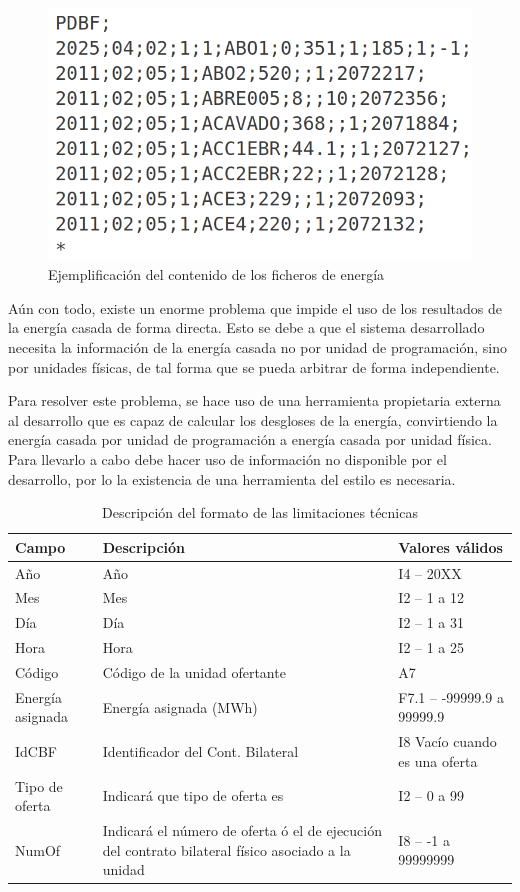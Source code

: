 \begin{figure}
\centering
\includegraphics[width=0.5\linewidth]{figures/contenido-energia.png}
\caption{Ejemplificación del contenido de los ficheros de energía}
\label{fig:contenido-energia}
\end{figure}

Aún con todo, existe un enorme problema que impide el uso de los resultados de la energía casada de forma directa. Esto se debe a que el sistema desarrollado necesita la información de la energía casada no por unidad de programación, sino por unidades físicas, de tal forma que se pueda arbitrar de forma independiente.

Para resolver este problema, se hace uso de una herramienta propietaria externa al desarrollo que es capaz de calcular los desgloses de la energía, convirtiendo la energía casada por unidad de programación a energía casada por unidad física. Para llevarlo a cabo debe hacer uso de información no disponible por el desarrollo, por lo la existencia de una herramienta del estilo es necesaria.

\begin{table}[ht]
\centering
\begin{tabular}{|l|p{5cm}|l|}
\hline
Campo & Descripción & Valores válidos \\
\hline
Año & Año & I4 -- 20XX \\
Mes & Mes & I2 -- 1 a 12 \\
Día & Día & I2 -- 1 a 31 \\
Hora & Hora & I2 -- 1 a 25 \\
Código & Código de la unidad ofertante & A7 \\
Energía asignada & Energía asignada (MWh) & F7.1 – -99999.9 a 99999.9 \\
IdCBF & Identificador del Cont. Bilateral & I8 Vacío cuando es una oferta \\
Tipo de oferta & Indicará que tipo de oferta es & I2 – 0 a 99 \\
NumOf & Indicará el número de oferta ó el de ejecución del contrato bilateral físico asociado a la unidad & I8 – -1 a 99999999 \\
\hline
\end{tabular}
\caption{Descripción del formato de las limitaciones técnicas}
\label{tab:descripción-limitaciones}
\end{table}

